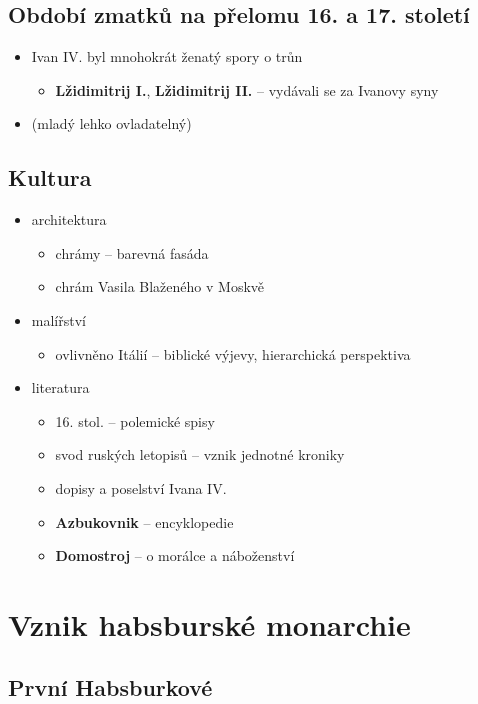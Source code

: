 \subsection{Období zmatků na přelomu 16. a 17. století}
\begin{itemize}
\item Ivan IV. byl mnohokrát ženatý \ra spory o trůn
\begin{itemize}
\item \textbf{Lžidimitrij I.}, \textbf{Lžidimitrij II.} -- vydávali se za Ivanovy syny
\end{itemize}
\item {} (mladý \ra lehko ovladatelný)
\end{itemize}

\subsection{Kultura}
\begin{itemize}
\item architektura
	\begin{itemize}
	\item chrámy -- barevná fasáda
	\item chrám Vasila Blaženého v Moskvě
	\end{itemize}
\item malířství 
\begin{itemize}
	\item ovlivněno Itálií -- biblické výjevy, hierarchická perspektiva
\end{itemize}
\item literatura
	\begin{itemize}
	\item 16. stol. -- polemické spisy
	\item svod ruských letopisů -- vznik jednotné kroniky
	\item dopisy a poselství Ivana IV.
	\item \textbf{Azbukovnik} -- encyklopedie
	\item \textbf{Domostroj} -- o morálce a náboženství
	\end{itemize}
\end{itemize}

\newpage
\section{Vznik habsburské monarchie}
\subsection{První Habsburkové}

